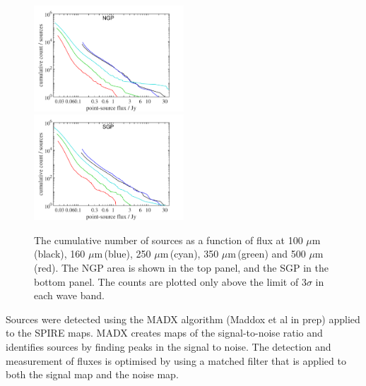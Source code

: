 \documentclass[useAMS,usenatbib]{mn2e}
\def\mic{ $\mu $m\,}
\begin{document}
\begin{figure} %
  \includegraphics[width=0.5\textwidth]{cum_counts_NGP.pdf}\\
  \includegraphics[width=0.5\textwidth]{cum_counts_SGP.pdf}
  \caption{\protect\label{fig_cum_flux} The cumulative number of
    sources as a function of flux at 100\mic (black), 160\mic (blue),
    250\mic (cyan), 350\mic (green) and 500\mic (red). The NGP area is
    shown in the top panel, and the SGP in the bottom panel. The
    counts are plotted only above the limit of 3$\sigma$ in each wave
    band.  }
\end{figure}

Sources were detected using the MADX algorithm (Maddox et al in prep)
applied to the SPIRE maps.  MADX creates maps of the signal-to-noise
ratio and identifies sources by finding peaks in the signal to noise. The
detection and measurement of fluxes is optimised by using a matched
filter that is applied to both the signal map and the noise map. 
\end{document}
